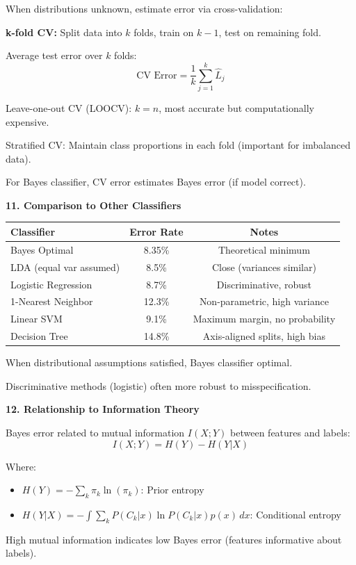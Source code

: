 \documentclass[12pt]{article}
\begin{document}
\begin{explanation}
When distributions unknown, estimate error via cross-validation:

\textbf{k-fold CV:} Split data into $k$ folds, train on $k-1$, test on remaining fold.

Average test error over $k$ folds:
\[\text{CV Error} = \frac{1}{k}\sum_{j=1}^k \hat{L}_j\]

Leave-one-out CV (LOOCV): $k = n$, most accurate but computationally expensive.

Stratified CV: Maintain class proportions in each fold (important for imbalanced data).

For Bayes classifier, CV error estimates Bayes error (if model correct).

\textbf{11. Comparison to Other Classifiers}

\begin{center}
\begin{tabular}{lcc}
Classifier & Error Rate & Notes \\
\hline
Bayes Optimal & 8.35\% & Theoretical minimum \\
LDA (equal var assumed) & 8.5\% & Close (variances similar) \\
Logistic Regression & 8.7\% & Discriminative, robust \\
1-Nearest Neighbor & 12.3\% & Non-parametric, high variance \\
Linear SVM & 9.1\% & Maximum margin, no probability \\
Decision Tree & 14.8\% & Axis-aligned splits, high bias \\
\end{tabular}
\end{center}

When distributional assumptions satisfied, Bayes classifier optimal.

Discriminative methods (logistic) often more robust to misspecification.

\textbf{12. Relationship to Information Theory}

Bayes error related to mutual information $I(X;Y)$ between features and labels:
\[I(X;Y) = H(Y) - H(Y|X)\]

Where:
\begin{itemize}
\item $H(Y) = -\sum_k \pi_k \ln(\pi_k)$: Prior entropy
\item $H(Y|X) = -\int \sum_k P(C_k|x) \ln P(C_k|x) p(x) \, dx$: Conditional entropy
\end{itemize}

High mutual information indicates low Bayes error (features informative about labels).


\end{explanation}
\end{document}
